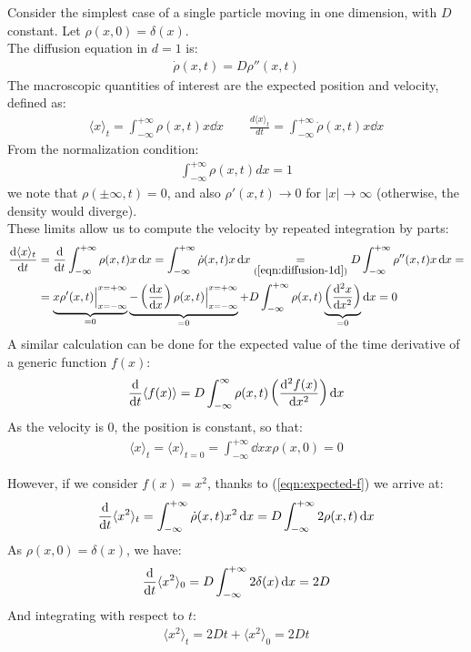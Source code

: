 \documentclass[../template.tex]{subfiles}
\begin{document}
\begin{example}[Particle diffusing in $d=1$]
Consider the simplest case of a single particle moving in one dimension, with $D$ constant. Let $\rho(x,0) = \delta (x)$.\\
The diffusion equation in $d=1$ is: 
\begin{align}
\dot{\rho}(x,t) = D\rho''(x,t)
\label{eqn:diffusion-1d}
\end{align}
The macroscopic quantities of interest are the expected position and velocity, defined as:
\begin{align*}
\langle x\rangle_t = \int_{-\infty}^{+\infty} \rho(x,t) x\dd{x} \qquad \frac{d\langle x\rangle_t}{dt} = \int_{-\infty}^{+\infty} \dot{\rho}(x,t)x\dd{x}
\end{align*}
From the normalization condition:
\begin{align*}
\int_{-\infty}^{+\infty} \rho(x,t) dx = 1
\end{align*}
we note that $\rho(\pm \infty,t) = 0$, and also $\rho'(x,t) \to 0$ for $|x|\to \infty$ (otherwise, the density would diverge).\\
These limits allow us to compute the velocity by repeated integration by parts:
\begin{align*}
    \dv{\langle x \rangle_t}{t} &= \dv{t} \int_{-\infty}^{+\infty} \rho(x,t) x \dd{x} = 
    \int_{-\infty}^{+\infty} \dot{\rho}(x,t) x \dd{x} \underset{(\ref{eqn:diffusion-1d})}{=}  D\int_{-\infty}^{+\infty} \rho''(x,t)x \dd{x} = \\
    &= \underbrace{x \rho'(x,t)\Big|_{x=-\infty}^{x=+\infty}}_{=0}  \underbrace{-\left(\dv{x}{x}\right)\rho(x,t)\Big|_{x=-\infty}^{x=+\infty}}_{=0}  +
    D \int_{-\infty}^{+\infty} \rho(x,t)\underbrace{\left(\dv[2]{x}{x}\right)}_{=0}\dd{x} = 0
\end{align*}
A similar calculation can be done for the expected value of the time derivative of a generic function $f(x)$:
\begin{align}
    \dv{t}\langle f(x) \rangle = D \int_{-\infty}^{\infty} \rho(x,t) \left(\dv[2]{f(x)}{x}\right) \dd{x}
    \label{eqn:expected-f}
\end{align} 
As the velocity is $0$, the position is constant, so that:
\begin{align*}
    \langle x \rangle_t = \langle x \rangle_{t=0} = \int_{-\infty}^{+\infty} \dd{x} x \rho(x,0) = 0
\end{align*}

However, if we consider $f(x) = x^2$, thanks to (\ref{eqn:expected-f}) we arrive at:
\begin{align*}
    \dv{t} \langle x^2 \rangle_t = \int_{-\infty}^{+\infty}\dot{\rho}(x,t) x^2 \dd{x} = D \int_{-\infty}^{+\infty} 2 \rho(x,t) \dd{x}
\end{align*}
As $\rho(x,0) = \delta(x)$, we have:
\begin{align*}
    \dv{t}\langle x^2 \rangle_0 = D \int_{-\infty}^{+\infty} 2\delta(x) \dd{x} = 2D
\end{align*}  
And integrating with respect to $t$:
\begin{align*}
    \langle x^2 \rangle_t = 2D t + \langle x^2 \rangle_0 = 2Dt
\end{align*} 
\end{example}
\end{document}
